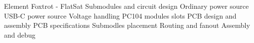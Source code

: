 
\chap Element Foxtrot - FlatSat
\sec Submodules and circuit design
\secc Ordinary power source
\secc USB-C power source
\secc Voltage handling
\secc PC104 modules slots
\sec PCB design and assembly
\secc PCB specifications
\secc Submodles placement
\secc Routing and fanout
\secc Assembly and debug

